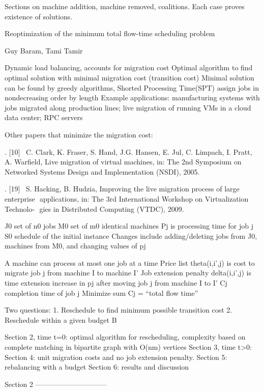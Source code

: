 \documentclass{article}
\begin{document}
Sections on machine addition, machine removed, coalitions.  Each case proves existence of solutions.




\cite{BARAM2014241}


Reoptimization of the minimum total flow-time scheduling problem 

Guy Baram, Tami Tamir

Dynamic load balancing, accounts for migration cost
Optimal algorithm to find optimal solution with minimal migration cost (transition cost)
Minimal solution can be found by greedy algorithms, Shorted Processing Time(SPT) assign jobs in nondecreasing order by length
Example applications: manufacturing systems with jobs migrated along production lines; live migration of running VMs in a cloud data center; RPC servers

Other papers that minimize the migration cost:

	.	[10]  C. Clark, K. Fraser, S. Hand, J.G. Hansen, E. Jul, C. Limpach, I. Pratt, A. Warfield, Live migration of virtual machines, in: The 2nd Symposium on Networked Systems Design and Implementation (NSDI), 2005. 

	.	[19]  S. Hacking, B. Hudzia, Improving the live migration process of large enterprise  applications, in: The 3rd International Workshop on Virtualization Technolo-  gies in Distributed Computing (VTDC), 2009.  

J0 set of n0 jobs
M0 set of m0 identical machines
Pj is processing time for job j
S0 schedule of the initial instance
Changes include adding/deleting jobs from J0, machines from M0, and changing values of pj

A machine can process at most one job at a time
Price list theta(i,i’,j) is cost to migrate job j from machine I to machine I’
Job extension penalty delta(i,i’,j) is time extension increase in pj after moving job j from machine I to I’
Cj completion time of job j
Minimize sum Cj = “total flow time”

Two questions:
1. Reschedule to find minimum possible transition cost
2. Reschedule within a given budget B

Section 2, time t=0: optimal algorithm for rescheduling, complexity based on complete matching in bipartite graph with O(nm) vertices
Section 3, time t>0:
Section 4: unit migration costs and no job extension penalty.
Section 5: rebalancing with a budget
Section 6: results and discussion

Section 2 ——————————
\end{document}
